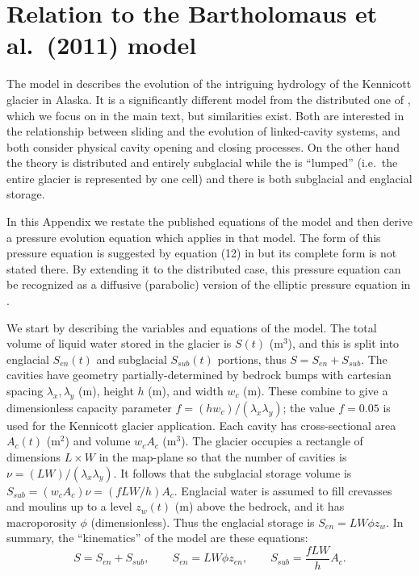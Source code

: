 \documentclass[11pt,final]{amsart}
\begin{document}

\small

\normalsize


\appendix
\small

\section{Relation to the Bartholomaus et al.~(2011) model}  \label{app:barth}

The model in \cite{Bartholomausetal2011} describes the evolution of the intriguing hydrology of the Kennicott glacier in Alaska.  It is a significantly different model from the distributed one of \cite{Schoofetal2012}, which we focus on in the main text, but similarities exist.  Both are interested in the relationship between sliding and the evolution of linked-cavity systems, and both consider physical cavity opening and closing processes.  On the other hand the \cite{Schoofetal2012} theory is distributed and entirely subglacial while the \cite{Bartholomausetal2011} is ``lumped'' (i.e.~the entire glacier is represented by one cell) and there is both subglacial and englacial storage.

In this Appendix we restate the published equations of the \cite{Bartholomausetal2011} model and then derive a pressure evolution equation which applies in that model.  The form of this pressure equation is suggested by equation (12) in \cite{Bartholomausetal2011} but its complete form is not stated there.  By extending it to the distributed case, this pressure equation can be recognized as a diffusive (parabolic) version of the elliptic pressure equation in \cite{Schoofetal2012}.

We start by describing the variables and equations of the \cite{Bartholomausetal2011} model.  The total volume of liquid water stored in the glacier is $S(t)$ (m$^3$), and this is split into englacial $S_{en}(t)$ and subglacial $S_{sub}(t)$ portions, thus $S=S_{en}+S_{sub}$.  The cavities have geometry partially-determined by bedrock bumps with cartesian spacing $\lambda_x,\lambda_y$ (m), height $h$ (m), and width $w_c$ (m).  These combine to give a dimensionless capacity parameter $f=(h w_c)/(\lambda_x \lambda_y)$; the value $f=0.05$ is used for the Kennicott glacier application.  Each cavity has cross-sectional area $A_c(t)$ (m$^2$) and volume $w_c A_c$ (m$^3$).  The glacier occupies a rectangle of dimensions $L\times W$ in the map-plane so that the number of cavities is $\nu = (LW)/(\lambda_x\lambda_y)$.  It follows that the subglacial storage volume is $S_{sub} = (w_c A_c) \nu = (f L W/h) A_c$.  Englacial water is assumed to fill crevasses and moulins up to a level $z_w(t)$ (m) above the bedrock, and it has macroporosity $\phi$ (dimensionless).  Thus the englacial storage is $S_{en}=L W \phi z_w$.  In summary, the ``kinematics'' of the \cite{Bartholomausetal2011} model are these equations:
\begin{equation}
S = S_{en} + S_{sub}, \qquad S_{en} = L W \phi z_{en}, \qquad S_{sub} = \frac{f L W}{h} A_c.  \label{eq:barth:kinematics}
\end{equation}
\end{document}
